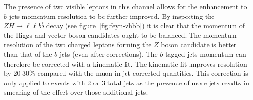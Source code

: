 The presence of two visible leptons in this channel allows for the enhancement
to $b$-jets momentum resolution to be further improved. By inspecting the $ZH
\to \ell\ell b\bar{b}$ decay (see figure~\ref{fig:feyn-vhbb}) it is clear that
the momentum of the Higgs and vector boson candidates ought to be balanced. The
momentum resolution of the two charged leptons forming the $Z$ boson candidate
is better than that of the $b$-jets (even after corrections). The $b$-tagged
jets momentum can therefore be corrected with a kinematic fit. The kinematic fit
improves resolution by 20-30\% compared with the muon-in-jet corrected
quantities. This correction is only applied to events with 2 or 3 total jets as
the presence of more jets results in smearing of the effect over those
additional jets.
